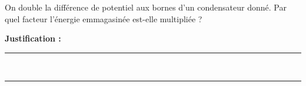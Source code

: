 On double la différence de potentiel aux bornes d'un condensateur donné. Par quel facteur l'énergie emmagasinée est-elle multipliée ?

\choices

\noindent\textbf{Justification :} \hrulefill \\[2.5ex]
\rule{\linewidth}{0.4pt} \\[2.5ex]
\rule{\linewidth}{0.4pt}
\vfill
